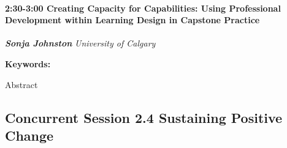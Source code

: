 \documentclass[
]{book}
\begin{document}
\begin{session}
\hypertarget{creating-capacity-for-capabilities-using-professional-development-within-learning-design-in-capstone-practice}{%
\paragraph*{\texorpdfstring{2:30-3:00 \textbar{} \textbf{Creating
Capacity for Capabilities: Using Professional Development within
Learning Design in Capstone} \textbar{}
Practice}{2:30-3:00 \textbar{} Creating Capacity for Capabilities: Using Professional Development within Learning Design in Capstone \textbar{} Practice}}\label{creating-capacity-for-capabilities-using-professional-development-within-learning-design-in-capstone-practice}}

\textbf{\emph{Sonja Johnston}} \textbar{} \emph{University of Calgary}

\textbf{Keywords:}

Abstract
\end{session}

\hypertarget{concurrent-session-2.4-sustaining-positive-change}{%
\subsection*{Concurrent Session 2.4 \textbar{} Sustaining Positive Change}\label{concurrent-session-2.4-sustaining-positive-change}}
\end{document}
